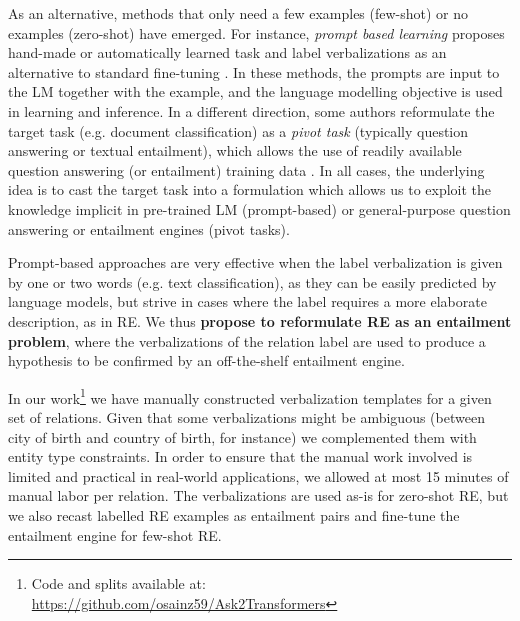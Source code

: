 \documentclass[11pt]{article}
\begin{document}
As an alternative, methods that only need a few examples (few-shot) or no examples (zero-shot) have emerged. 
For instance, \textit{prompt based learning} proposes hand-made or automatically learned task and label verbalizations \cite{puri2019zeroShot,schick-schutze-2021-exploiting,schick2020small} as an alternative to standard fine-tuning \cite{gao2020making,scao2021data}. In these methods, the prompts are input to the LM together with the example, and the language modelling objective is used in learning and inference. 
In a different direction, some authors reformulate the target task (e.g. document classification) as a  \textit{pivot task} (typically question answering or textual entailment), which allows the use of readily available question answering (or entailment) training data \cite{yin-etal-2019-benchmarking,levy-etal-2017-zero}.  In all cases, the underlying idea is to cast the target task into a formulation which allows us to exploit the knowledge implicit in pre-trained LM (prompt-based) or general-purpose question answering or entailment engines (pivot tasks). 















Prompt-based approaches are very effective when the label verbalization is given by one or two words (e.g. text classification), as they can be easily predicted by language models, but strive in cases where the label requires a more elaborate description, as in RE. We thus \textbf{propose to reformulate RE as an entailment problem}, where the verbalizations of the relation label are used to produce a hypothesis to be confirmed by an off-the-shelf entailment engine. 















In our work\footnote{Code and splits available at: \url{https://github.com/osainz59/Ask2Transformers}} we have manually constructed verbalization templates for a given set of relations. Given that some verbalizations might be ambiguous (between city of birth and country of birth, for instance) we complemented them with entity type constraints. In order to ensure that the manual work involved is limited and practical in real-world applications, we allowed at most 15 minutes of manual labor per relation. The verbalizations are used as-is for zero-shot RE, but we also recast labelled RE examples as entailment pairs and fine-tune the entailment engine for few-shot RE.
\end{document}
